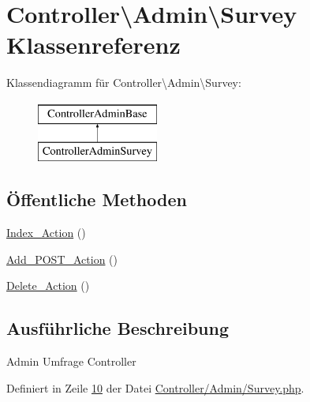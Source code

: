 \hypertarget{class_controller_1_1_admin_1_1_survey}{\section{Controller\textbackslash{}Admin\textbackslash{}Survey Klassenreferenz}
\label{class_controller_1_1_admin_1_1_survey}
}
Klassendiagramm für Controller\textbackslash{}Admin\textbackslash{}Survey\-:\begin{figure}[H]
\begin{center}
\leavevmode
\includegraphics[height=2.000000cm]{class_controller_1_1_admin_1_1_survey}
\end{center}
\end{figure}
\subsection*{Öffentliche Methoden}
\begin{DoxyCompactItemize}
\item 
\hyperlink{class_controller_1_1_admin_1_1_survey_ab79ba5fab3d2048a72c71fcd3176dd72}{Index\-\_\-\-Action} ()
\item 
\hyperlink{class_controller_1_1_admin_1_1_survey_a618d9d0d906df279c7b34ae9458fa977}{Add\-\_\-\-P\-O\-S\-T\-\_\-\-Action} ()
\item 
\hyperlink{class_controller_1_1_admin_1_1_survey_aeb20127715fb6ab072bf09e0aa69e9f3}{Delete\-\_\-\-Action} ()
\end{DoxyCompactItemize}


\subsection{Ausführliche Beschreibung}
Admin Umfrage Controller 

Definiert in Zeile \hyperlink{_controller_2_admin_2_survey_8php_source_l00010}{10} der Datei \hyperlink{_controller_2_admin_2_survey_8php_source}{Controller/\-Admin/\-Survey.\-php}.



